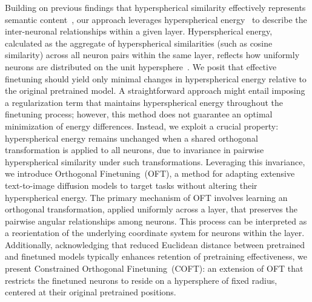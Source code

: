 Building on previous findings that hyperspherical similarity effectively represents semantic content~\cite{liu2017deep,liu2018decoupled,chen2020angular}, our approach leverages hyperspherical energy~\cite{liu2018learning} to describe the inter-neuronal relationships within a given layer. Hyperspherical energy, calculated as the aggregate of hyperspherical similarities (such as cosine similarity) across all neuron pairs within the same layer, reflects how uniformly neurons are distributed on the unit hypersphere~\cite{liu2021learning}. We posit that effective finetuning should yield only minimal changes in hyperspherical energy relative to the original pretrained model. A straightforward approach might entail imposing a regularization term that maintains hyperspherical energy throughout the finetuning process; however, this method does not guarantee an optimal minimization of energy differences. Instead, we exploit a crucial property: hyperspherical energy remains unchanged when a shared orthogonal transformation is applied to all neurons, due to invariance in pairwise hyperspherical similarity under such transformations. Leveraging this invariance, we introduce Orthogonal Finetuning~(OFT), a method for adapting extensive text-to-image diffusion models to target tasks without altering their hyperspherical energy. The primary mechanism of OFT involves learning an orthogonal transformation, applied uniformly across a layer, that preserves the pairwise angular relationships among neurons. This process can be interpreted as a reorientation of the underlying coordinate system for neurons within the layer. Additionally, acknowledging that reduced Euclidean distance between pretrained and finetuned models typically enhances retention of pretraining effectiveness, we present Constrained Orthogonal Finetuning~(COFT): an extension of OFT that restricts the finetuned neurons to reside on a hypersphere of fixed radius, centered at their original pretrained positions.

